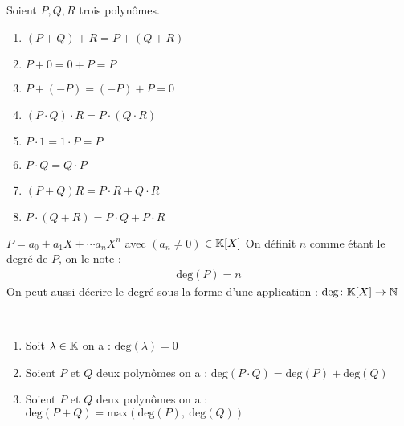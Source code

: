 \begin{graybox}
    \begin{proposition}
        Soient $P, Q, R$ trois polynômes.   
        \begin{enumerate}
            \item $(P + Q) + R = P + (Q + R)$
            \item $P + 0 = 0 + P = P$
            \item $P + (-P) = (-P) + P = 0$
            \item $(P \cdot Q) \cdot R = P \cdot (Q \cdot R)$
            \item $P \cdot 1 = 1 \cdot P = P$
            \item $P \cdot Q = Q \cdot P$ 
            \item $(P + Q) R = P \cdot R + Q \cdot R$
            \item $P \cdot (Q + R) = P \cdot Q + P \cdot R$
        \end{enumerate}
    \end{proposition}
\end{graybox}

\begin{graybox}
    \begin{definition}
        $P = a_0 + a_1 X + \cdots a_n X^n$ avec $(a_n \neq 0)$ $\in \mathbb{K}[X]$
        On définit $n$ comme étant le degré de $P$, on le note :
        \begin{align*}
            \mathrm{deg}(P) = n
        \end{align*}
        On peut aussi décrire le degré sous la forme d'une application :
        $\mathrm{deg} \colon \mathbb{K}[X] \to \mathbb{N}$
    \end{definition}
\end{graybox}

\begin{graybox}
    \begin{proposition}~ 
        \begin{enumerate}
            \item Soit $\lambda \in \mathbb{K}$ on a : $\mathrm{deg}(\lambda) = 0$
            \item Soient $P$ et $Q$ deux polynômes on a : $\mathrm{deg}(P \cdot Q) = \mathrm{deg}(P) + \mathrm{deg}(Q)$
            \item Soient $P$ et $Q$ deux polynômes on a :
            $\mathrm{deg}(P + Q) = \mathrm{max}\left(\mathrm{deg}(P),\ \mathrm{deg}(Q)\right)$
        \end{enumerate}
    \end{proposition}
\end{graybox}

